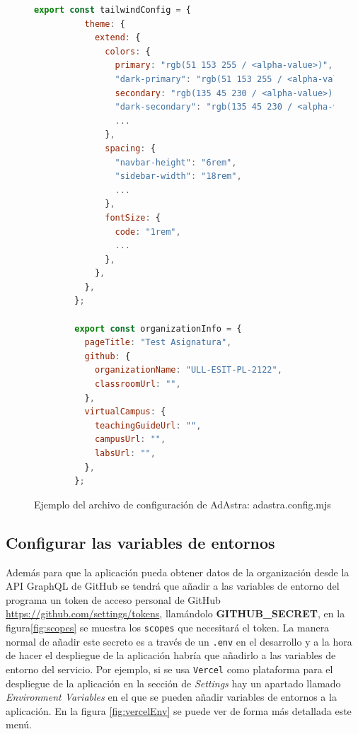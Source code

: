 \begin{figure}
  \begin{lstlisting}[language=Javascript]
        export const tailwindConfig = {
          theme: {
            extend: {
              colors: {
                primary: "rgb(51 153 255 / <alpha-value>)",
                "dark-primary": "rgb(51 153 255 / <alpha-value>)",
                secondary: "rgb(135 45 230 / <alpha-value>)",
                "dark-secondary": "rgb(135 45 230 / <alpha-value>)",
                ...
              },
              spacing: {
                "navbar-height": "6rem",
                "sidebar-width": "18rem",
                ...
              },
              fontSize: {
                code: "1rem",
                ...
              },
            },
          },
        };
        
        export const organizationInfo = {
          pageTitle: "Test Asignatura",
          github: {
            organizationName: "ULL-ESIT-PL-2122",
            classroomUrl: "",
          },
          virtualCampus: {
            teachingGuideUrl: "",
            campusUrl: "",
            labsUrl: "",
          },
        };
    \end{lstlisting}
    \caption{Ejemplo del archivo de configuración de AdAstra: adastra.config.mjs}
    \label{fig:adastraConfig}
\end{figure}

\subsection{Configurar las variables de entornos}

Además para que la aplicación pueda obtener datos de la organización desde la API GraphQL de GitHub se tendrá que añadir a las variables de entorno del programa un token de acceso personal de GitHub \url{https://github.com/settings/tokens}, llamándolo \textbf{GITHUB\_SECRET}, en la figura\ref{fig:scopes} se muestra los \verb|scopes| que necesitará el token. La manera normal de añadir este secreto es a través de un \verb|.env| en el desarrollo y a la hora de hacer el despliegue de la aplicación habría que añadirlo a las variables de entorno del servicio. Por ejemplo, si se usa \verb|Vercel| \cite{vercel} como plataforma para el despliegue de la aplicación en la sección de \textit{Settings} hay un apartado llamado 
\textit{Environment Variables} en el que se pueden añadir variables de entornos a la aplicación. En la figura \ref{fig:vercelEnv} se puede ver de forma más detallada este menú.

